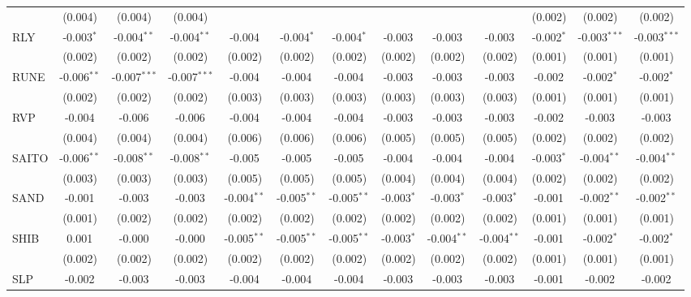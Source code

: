 \begin{table}[!htbp]
\begin{tabular}{@{\extracolsep{5pt}}lcccccccccccc}
  & (0.004) & (0.004) & (0.004) & & & & & & & (0.002) & (0.002) & (0.002) \\
 RLY & -0.003$^{*}$ & -0.004$^{**}$ & -0.004$^{**}$ & -0.004$^{}$ & -0.004$^{*}$ & -0.004$^{*}$ & -0.003$^{}$ & -0.003$^{}$ & -0.003$^{}$ & -0.002$^{*}$ & -0.003$^{***}$ & -0.003$^{***}$ \\
  & (0.002) & (0.002) & (0.002) & (0.002) & (0.002) & (0.002) & (0.002) & (0.002) & (0.002) & (0.001) & (0.001) & (0.001) \\
 RUNE & -0.006$^{**}$ & -0.007$^{***}$ & -0.007$^{***}$ & -0.004$^{}$ & -0.004$^{}$ & -0.004$^{}$ & -0.003$^{}$ & -0.003$^{}$ & -0.003$^{}$ & -0.002$^{}$ & -0.002$^{*}$ & -0.002$^{*}$ \\
  & (0.002) & (0.002) & (0.002) & (0.003) & (0.003) & (0.003) & (0.003) & (0.003) & (0.003) & (0.001) & (0.001) & (0.001) \\
 RVP & -0.004$^{}$ & -0.006$^{}$ & -0.006$^{}$ & -0.004$^{}$ & -0.004$^{}$ & -0.004$^{}$ & -0.003$^{}$ & -0.003$^{}$ & -0.003$^{}$ & -0.002$^{}$ & -0.003$^{}$ & -0.003$^{}$ \\
  & (0.004) & (0.004) & (0.004) & (0.006) & (0.006) & (0.006) & (0.005) & (0.005) & (0.005) & (0.002) & (0.002) & (0.002) \\
 SAITO & -0.006$^{**}$ & -0.008$^{**}$ & -0.008$^{**}$ & -0.005$^{}$ & -0.005$^{}$ & -0.005$^{}$ & -0.004$^{}$ & -0.004$^{}$ & -0.004$^{}$ & -0.003$^{*}$ & -0.004$^{**}$ & -0.004$^{**}$ \\
  & (0.003) & (0.003) & (0.003) & (0.005) & (0.005) & (0.005) & (0.004) & (0.004) & (0.004) & (0.002) & (0.002) & (0.002) \\
 SAND & -0.001$^{}$ & -0.003$^{}$ & -0.003$^{}$ & -0.004$^{**}$ & -0.005$^{**}$ & -0.005$^{**}$ & -0.003$^{*}$ & -0.003$^{*}$ & -0.003$^{*}$ & -0.001$^{}$ & -0.002$^{**}$ & -0.002$^{**}$ \\
  & (0.001) & (0.002) & (0.002) & (0.002) & (0.002) & (0.002) & (0.002) & (0.002) & (0.002) & (0.001) & (0.001) & (0.001) \\
 SHIB & 0.001$^{}$ & -0.000$^{}$ & -0.000$^{}$ & -0.005$^{**}$ & -0.005$^{**}$ & -0.005$^{**}$ & -0.003$^{*}$ & -0.004$^{**}$ & -0.004$^{**}$ & -0.001$^{}$ & -0.002$^{*}$ & -0.002$^{*}$ \\
  & (0.002) & (0.002) & (0.002) & (0.002) & (0.002) & (0.002) & (0.002) & (0.002) & (0.002) & (0.001) & (0.001) & (0.001) \\
 SLP & -0.002$^{}$ & -0.003$^{}$ & -0.003$^{}$ & -0.004$^{}$ & -0.004$^{}$ & -0.004$^{}$ & -0.003$^{}$ & -0.003$^{}$ & -0.003$^{}$ & -0.001$^{}$ & -0.002$^{}$ & -0.002$^{}$ \\

\end{tabular}
\end{table}
